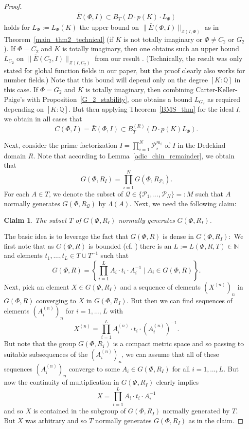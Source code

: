 \documentclass[12pt]{amsart}
\newcommand{\C}[1]{{\mathcal #1}}
\newtheorem{claim}{Claim}
\theoremstyle{definition}\newtheorem{definition}[theorem]{Definition}
\theoremstyle{remark}\newtheorem{remark}[theorem]{Remark}
\theoremstyle{definition}\newtheorem{case}{Case}
\begin{document}
\begin{proof}
\begin{align*}
\bar{E}(\Phi,I)\subset B_T(D\cdot p(K)\cdot L_{\Phi})
 \end{align*}
holds for $L_{\Phi}:=L_{\Phi}(K)$ the upper bound on $\|\bar{E}(\Phi,I)\|_{Z(I,\Phi)}$ as in Theorem~\ref{main_thm2_technical} (if $K$ is not totally imaginary or $\Phi\neq C_2$ or $G_2$). If $\Phi=C_2$ and $K$ is totally imaginary, then one obtains such an upper bound $L_{C_2}$ on $\|\bar{E}(C_2,I)\|_{Z(I,C_2)}$ from our result \cite[Theorem~3.13]{Chevalley_positive_char_tentative}. (Technically, the result was only stated for global function fields in our paper, but the proof clearly also works for number fields.) Note that this bound will depend only on the degree $[K:\mathbb{Q}]$ in this case. If $\Phi=G_2$ and $K$ is totally imaginary, then combining Carter-Keller-Paige's \cite[Corollary~3.13]{MR2357719} with Proposition~\ref{G_2_stability}, one obtains a bound $L_{G_2}$ as required depending on $[K:\mathbb{Q}].$ But then applying Theorem~\ref{BMS_thm} for the ideal $I$, we obtain in all cases that 
\begin{equation}\label{main_thm2_eq}
C(\Phi,I)=\bar{E}(\Phi,I)\subset B_T^{(R)}(D\cdot p(K) L_{\Phi}).
\end{equation} 

Next, consider the prime factorization $I=\prod_{i=1}^N\C P_i^{m_i}$ of $I$ in the Dedekind domain $R.$ Note that according to Lemma~\ref{adic_chin_remainder}, we obtain that 
\begin{equation}\label{p_adic_chineseII}
G(\Phi,R_I)=\prod_{i=1}^N G(\Phi,R_{\C P_i}).
\end{equation}
For each $A\in T$, we denote the subset of $\C Q\in\{\C P_1,\dots,\C P_N\}=:M$ such that $A$ normally generates $G(\Phi,R_{\C Q})$ by $\Lambda(A).$ Next, we need the following claim: 
\begin{claim}\label{densely_generated_claim}
The subset $T$ of $G(\Phi,R_I)$ normally generates $G(\Phi,R_I)$.
\end{claim}
The basic idea is to leverage the fact that $G(\Phi,R)$ is dense in $G(\Phi,R_I):$ We first note that as $G(\Phi,R)$ is bounded (cf. \cite{Gal-Kedra-Trost}) there is an $L:=L(\Phi,R,T)\in\mathbb{N}$ and elements $t_1,\dots,t_L\in T\cup T^{-1}$ such that 
\[
G(\Phi,R)=\left\{\prod_{i=1}^L A_i\cdot t_i\cdot A_i^{-1}\mid A_i\in G(\Phi,R)\right\}.
\]
Next, pick an element $X\in G(\Phi,R_I)$ and a sequence of elements $(X^{(n)})_n$ in $G(\Phi,R)$ converging to $X$ in $G(\Phi,R_I).$ But then we can find sequences of elements $(A_i^{(n)})_n$ for $i=1,\dots,L$ with 
\[
X^{(n)}=\prod_{i=1}^L A_i^{(n)}\cdot t_i\cdot (A_i^{(n)})^{-1}.
\]
But note that the group $G(\Phi,R_I)$ is a compact metric space and so passing to suitable subsequences of the $(A_i^{(n)})_n$, we can assume that all of these sequences $(A_i^{(n)})_n$ converge to some $A_i\in G(\Phi,R_I)$ for all $i=1,\dots,L.$ But now the continuity of multiplication in $G(\Phi,R_I)$ clearly implies 
\[
X=\prod_{i=1}^L A_i\cdot t_i\cdot A_i^{-1}
\]
and so $X$ is contained in the subgroup of $G(\Phi,R_I)$ normally generated by $T$. But $X$ was arbitrary and so $T$ normally generates $G(\Phi,R_I)$ as in the claim.


\end{proof}
\end{document}
